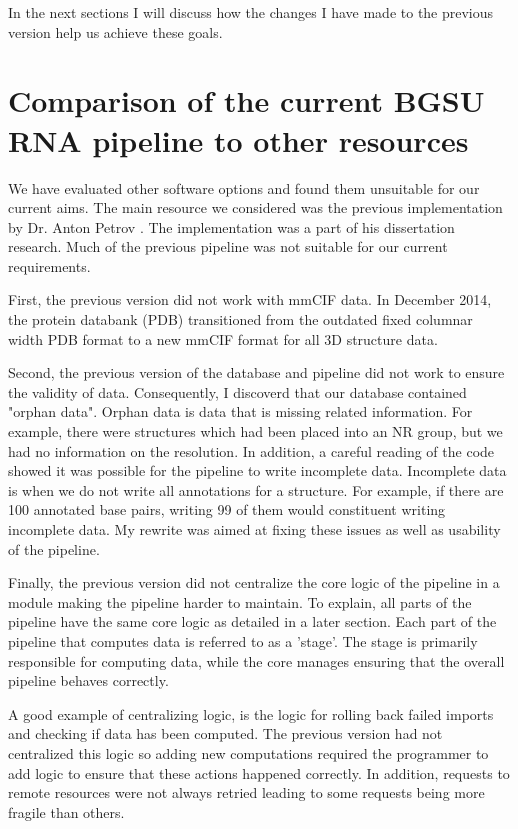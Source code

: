 In the next sections I will discuss how the changes I have made to the previous
version help us achieve these goals.

\section{Comparison of the current BGSU RNA pipeline to other resources}

We have evaluated other software options and found them unsuitable for our
current aims. The main resource we considered was the previous implementation by
Dr. Anton Petrov \cite{Petrov2012}. The implementation was a part of his dissertation research.
Much of the previous pipeline was not suitable for our current requirements.

First, the previous version did not work with mmCIF data. In December 2014, the
protein databank (PDB) transitioned from the outdated fixed columnar width  PDB
format to a new mmCIF format for all 3D structure data.

Second, the previous version of the database and pipeline did not work to ensure
the validity of data. Consequently, I discoverd that our database contained
"orphan data". Orphan data is data that is missing related information. For
example, there were structures which had been placed into an NR group, but we
had no information on the resolution. In addition, a careful reading of the code
showed it was possible for the pipeline to write incomplete data. Incomplete
data is when we do not write all annotations for a structure. For example, if
there are 100 annotated base pairs, writing 99 of them would constituent writing
incomplete data. My rewrite was aimed at fixing these issues as well as
usability of the pipeline.

Finally, the previous version did not centralize the core logic of the pipeline
in a module making the pipeline harder to maintain. To explain, all parts of the
pipeline have the same core logic as detailed in a later section. Each part of
the pipeline that computes data is referred to as a 'stage'. The stage is
primarily responsible for computing data, while the core manages ensuring that
the overall pipeline behaves correctly.

A good example of centralizing logic, is the logic for rolling back failed
imports and checking if data has been computed. The previous version had not
centralized this logic so adding new computations required the programmer to add
logic to ensure that these actions happened correctly. In addition, requests to
remote resources were not always retried leading to some requests being more
fragile than others.

